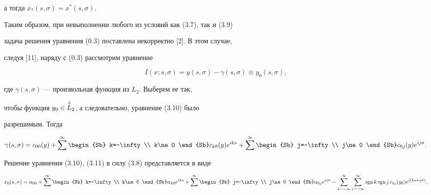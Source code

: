а тогда $x_*(s,\sigma) = x^*(s,\sigma)$.





Таким образом, при невыполнении любого из условий как (3.7), так и (3.9) 


задача решения уравнения (0.3) поставлена некорректно [2]. В этом случае, 


следуя [11], наряду с (0.3) рассмотрим уравнение


\begin{equation}


I(x;s,\sigma) = y(s,\sigma) - \gamma(s,\sigma)\equiv y_0(s,\sigma),


\end{equation}


где $\gamma(s,\sigma)$ --- произвольная функция из $L_2$. Выберем ее так, 


чтобы функция $y_0 \in \overset{\circ}{L}{}_2$, а следовательно, уравнение (3.10) было 


разрешимым. Тогда 


\begin{equation}


\gamma(s,\sigma) = c_{00}(y) +


\sum^\infty\begin{Sb} k=-\infty \\ k\ne 0 \end{Sb}


c_{k0}(y)e^{iks} +


\sum^\infty\begin{Sb} j=-\infty \\ j\ne 0 \end{Sb}


c_{0j}(y)e^{ij\sigma}.


\end{equation}


Решение уравнения (3.10), (3.11) в силу (3.8) представляется в виде


\begin{equation}


x_0(s,\sigma) = \alpha_{00} +


\sum^\infty\begin{Sb} k=-\infty \\ k\ne 0 \end{Sb}


\alpha_{k0}e^{iks}+


\sum^\infty\begin{Sb} j=-\infty \\ j\ne 0 \end{Sb}


\alpha_{0j}e^{ij\sigma}


- \suml_{k=-\infty}^\infty\suml_{j=-\infty}^\infty


\sgn k \sgn j\, c_{kj}(y_0)e^{i(ks+j\sigma)},


\end{equation}


